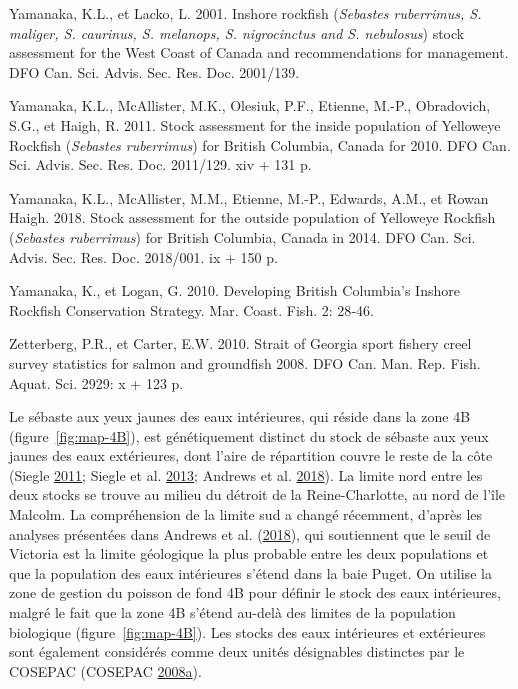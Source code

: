 \documentclass[french,11pt]{book}
\begin{document}
\leavevmode\hypertarget{ref-yamanaka2001}{}%
Yamanaka, K.L., et Lacko, L. 2001. Inshore rockfish (\emph{Sebastes ruberrimus, S. maliger, S. caurinus, S. melanops, S. nigrocinctus and S. nebulosus}) stock assessment for the West Coast of Canada and recommendations for management. DFO Can. Sci. Advis. Sec. Res. Doc. 2001/139.

\leavevmode\hypertarget{ref-yamanaka2011}{}%
Yamanaka, K.L., McAllister, M.K., Olesiuk, P.F., Etienne, M.-P., Obradovich, S.G., et Haigh, R. 2011. Stock assessment for the inside population of Yelloweye Rockfish (\emph{Sebastes ruberrimus}) for British Columbia, Canada for 2010. DFO Can. Sci. Advis. Sec. Res. Doc. 2011/129. xiv + 131 p.

\leavevmode\hypertarget{ref-yamanaka2018yelloweyeoutside}{}%
Yamanaka, K.L., McAllister, M.M., Etienne, M.-P., Edwards, A.M., et Rowan Haigh. 2018. Stock assessment for the outside population of Yelloweye Rockfish (\emph{Sebastes ruberrimus}) for British Columbia, Canada in 2014. DFO Can. Sci. Advis. Sec. Res. Doc. 2018/001. ix + 150 p.

\leavevmode\hypertarget{ref-yamanaka2010}{}%
Yamanaka, K., et Logan, G. 2010. Developing British Columbia's Inshore Rockfish Conservation Strategy. Mar. Coast. Fish. 2: 28‑46.

\leavevmode\hypertarget{ref-zetterberg2010}{}%
Zetterberg, P.R., et Carter, E.W. 2010. Strait of Georgia sport fishery creel survey statistics for salmon and groundfish 2008. DFO Can. Man. Rep. Fish. Aquat. Sci. 2929: x + 123 p.

\setlength{\parindent}{0in} \setlength{\leftskip}{0in} \setlength{\parskip}{4pt}

\clearpage

\Appendices


\clearpage

\label{app:biological-data}

Le sébaste aux yeux jaunes des eaux intérieures, qui réside dans la zone 4B (figure~\ref{fig:map-4B}), est génétiquement distinct du stock de sébaste aux yeux jaunes des eaux extérieures, dont l'aire de répartition couvre le reste de la côte (Siegle \protect\hyperlink{ref-siegle2011}{2011}; Siegle et al. \protect\hyperlink{ref-siegle2013}{2013}; Andrews et al. \protect\hyperlink{ref-andrews2018}{2018}). La limite nord entre les deux stocks se trouve au milieu du détroit de la Reine-Charlotte, au nord de l'île Malcolm. La compréhension de la limite sud a changé récemment, d'après les analyses présentées dans Andrews et al. (\protect\hyperlink{ref-andrews2018}{2018}), qui soutiennent que le seuil de Victoria est la limite géologique la plus probable entre les deux populations et que la population des eaux intérieures s'étend dans la baie Puget. On utilise la zone de gestion du poisson de fond 4B pour définir le stock des eaux intérieures, malgré le fait que la zone 4B s'étend au-delà des limites de la population biologique (figure~\ref{fig:map-4B}). Les stocks des eaux intérieures et extérieures sont également considérés comme deux unités désignables distinctes par le COSEPAC (COSEPAC \protect\hyperlink{ref-cosewic2008}{2008}\protect\hyperlink{ref-cosewic2008}{a}).
\end{document}
